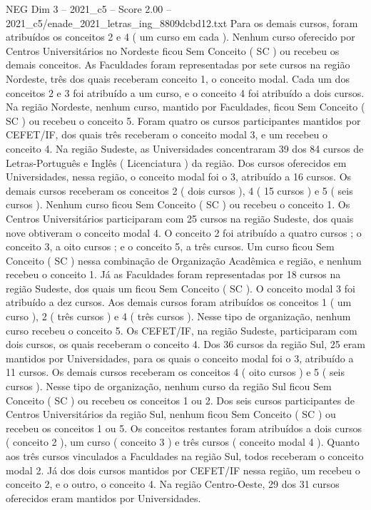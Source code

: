 \begin{textsample}{NEG Dim 3 – 2021\_c5 – Score 2.00 – 2021\_c5/enade\_2021\_letras\_ing\_8809dcbd12.txt}
Para os demais cursos, foram atribuídos os conceitos 2 e 4 ( um curso em cada ).
Nenhum curso oferecido por Centros Universitários no Nordeste ficou Sem Conceito ( SC ) ou recebeu os demais conceitos.
As Faculdades foram representadas por sete cursos na região Nordeste, três dos quais receberam conceito 1, o conceito modal.
Cada um dos conceitos 2 e 3 foi atribuído a um curso, e o conceito 4 foi atribuído a dois cursos.
Na região Nordeste, nenhum curso, mantido por Faculdades, ficou Sem Conceito ( SC ) ou recebeu o conceito 5.
Foram quatro os cursos participantes mantidos por CEFET/IF, dos quais três receberam o conceito modal 3, e um recebeu o conceito 4.
Na região Sudeste, as Universidades concentraram 39 dos 84 cursos de Letras-Português e Inglês ( Licenciatura ) da região.
Dos cursos oferecidos em Universidades, nessa região, o conceito modal foi o 3, atribuído a 16 cursos.
Os demais cursos receberam os conceitos 2 ( dois cursos ), 4 ( 15 cursos ) e 5 ( seis cursos ).
Nenhum curso ficou Sem Conceito ( SC ) ou recebeu o conceito 1.
Os Centros Universitários participaram com 25 cursos na região Sudeste, dos quais nove obtiveram o conceito modal 4.
O conceito 2 foi atribuído a quatro cursos ; o conceito 3, a oito cursos ; e o conceito 5, a três cursos.
Um curso ficou Sem Conceito ( SC ) nessa combinação de Organização Acadêmica e região, e nenhum recebeu o conceito 1.
Já as Faculdades foram representadas por 18 cursos na região Sudeste, dos quais um ficou Sem Conceito ( SC ).
O conceito modal 3 foi atribuído a dez cursos.
Aos demais cursos foram atribuídos os conceitos 1 ( um curso ), 2 ( três cursos ) e 4 ( três cursos ).
Nesse tipo de organização, nenhum curso recebeu o conceito 5.
Os CEFET/IF, na região Sudeste, participaram com dois cursos, os quais receberam o conceito 4.
Dos 36 cursos da região Sul, 25 eram mantidos por Universidades, para os quais o conceito modal foi o 3, atribuído a 11 cursos.
Os demais cursos receberam os conceitos 4 ( oito cursos ) e 5 ( seis cursos ).
Nesse tipo de organização, nenhum curso da região Sul ficou Sem Conceito ( SC ) ou recebeu os conceitos 1 ou 2.
Dos seis cursos participantes de Centros Universitários da região Sul, nenhum ficou Sem Conceito ( SC ) ou recebeu os conceitos 1 ou 5.
Os conceitos restantes foram atribuídos a dois cursos ( conceito 2 ), um curso ( conceito 3 ) e três cursos ( conceito modal 4 ).
Quanto aos três cursos vinculados a Faculdades na região Sul, todos receberam o conceito modal 2.
Já dos dois cursos mantidos por CEFET/IF nessa região, um recebeu o conceito 2, e o outro, o conceito 4.
Na região Centro-Oeste, 29 dos 31 cursos oferecidos eram mantidos por Universidades.

\end{textsample}
